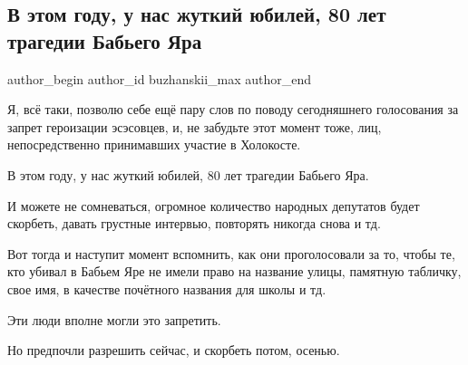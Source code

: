  
 
 
 
 
 
\subsection{В этом году, у нас жуткий юбилей, 80 лет трагедии Бабьего Яра}
\label{sec:03_06_2021.fb.buzhanskii_max.1.babij_jar_zakon_parlament_golosovanie}
\ifcmt
 author_begin
   author_id buzhanskii_max
 author_end
\fi

Я, всё таки, позволю себе ещё пару слов по поводу сегодняшнего голосования за
запрет героизации эсэсовцев, и, не забудьте этот момент тоже, лиц,
непосредственно принимавших участие в Холокосте.

В этом году, у нас жуткий юбилей, 80 лет трагедии Бабьего Яра.

И можете не сомневаться, огромное количество народных депутатов будет скорбеть,
давать грустные интервью, повторять никогда снова и тд.

Вот тогда и наступит момент вспомнить, как они проголосовали за то, чтобы те,
кто убивал в Бабьем Яре не имели право на название улицы, памятную табличку,
свое имя, в качестве почётного названия для школы и тд.

Эти люди вполне могли это запретить.

Но предпочли разрешить сейчас, и скорбеть потом, осенью.





